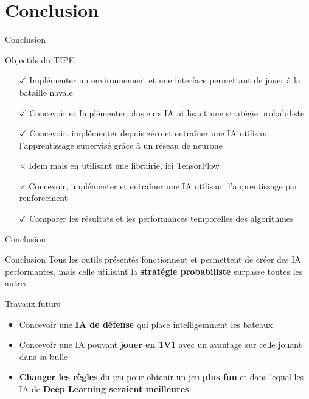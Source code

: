 \section{Conclusion}

\begin{frame}{Conclusion}
    \begin{block}{Objectifs du TIPE}
        \begin{itemize}
            \item[$\checkmark$] Implémenter un environnement et une interface permettant de jouer à la bataille navale
            \item[$\checkmark$] Concevoir et Implémenter plusieurs IA utilisant une stratégie probabiliste
            \item[$\checkmark$] Concevoir, implémenter depuis zéro et entraîner une IA utilisant l'apprentissage supervisé grâce à un
réseau de neurone
            \item[$\times$] Idem mais en utilisant une librairie, ici TensorFlow
            \item[$\times$] Concevoir, implémenter et entraîner une IA utilisant l'apprentissage par renforcement
            \item[$\checkmark$] Comparer les résultats et les performances temporelles des algorithmes
        \end{itemize}{}
    \end{block}
\end{frame}{}

\begin{frame}{Conclusion}
    \begin{block}{Conclusion}
        Tous les outils présentés fonctionnent et permettent de créer des IA performantes, mais celle utilisant la \textbf{stratégie probabiliste} surpasse toutes les autres.
    \end{block}
\end{frame}

\begin{frame}{Travaux futurs}
    \begin{block}{}
        \begin{itemize}
            \item Concevoir une \textbf{IA de défense} qui place intelligemment les bateaux
            \item Concevoir une IA pouvant \textbf{jouer en 1V1} avec un avantage sur celle jouant dans sa bulle
            \item \textbf{Changer les règles} du jeu pour obtenir un jeu \textbf{plus fun} et dans lequel les IA de \textbf{Deep Learning seraient meilleures}
        \end{itemize}{}
    \end{block}
\end{frame}{}